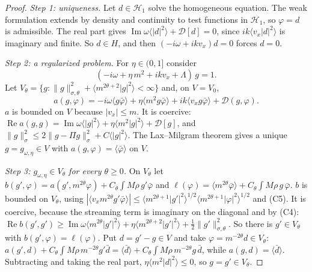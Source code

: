 \documentclass[11pt]{article}
\newcommand{\cD}{\mathcal{D}}
\newcommand{\cH}{\mathcal{H}}
\newcommand{\avg}[1]{\langle #1\rangle}
\renewcommand{\Re}{\operatorname{Re}}
\renewcommand{\Im}{\operatorname{Im}}
\theoremstyle{remark}
\begin{document}
\begin{proof}
\emph{Step 1: uniqueness.} Let $d\in\cH_1$ solve the homogeneous equation.
The weak formulation extends by density and continuity to test functions in
$\cH_1$, so $\varphi=d$ is admissible. The real part gives
$\Im\omega\avg{|d|^2}+\cD[d]=0$, since $ik\avg{v_x|d|^2}$ is imaginary and
finite. So $d\in H$, and then $(-i\omega+ikv_x)d=0$ forces $d=0$.

\emph{Step 2: a regularized problem.} For $\eta\in(0,1]$ consider
\begin{equation}
  (-i\omega+\eta\,m^2+ikv_x+\Lambda)\,g=1 .
  \label{eq:reg}
\end{equation}
Let $V_\theta=\{g:\|g\|^2_{\sigma,\theta}+\avg{m^{2\theta+2}|g|^2}<\infty\}$
and, on $V=V_0$,
\[
  a(g,\varphi)=-i\omega\avg{g\bar\varphi}+\eta\avg{m^2g\bar\varphi}
  +ik\avg{v_xg\bar\varphi}+\cD(g,\varphi).
\]
$a$ is bounded on $V$ because $|v_x|\le m$. It is coercive:
$\Re a(g,g)=\Im\omega\avg{|g|^2}+\eta\avg{m^2|g|^2}+\cD[g]$, and
$\|g\|^2_\sigma\le2\|g-\Pi g\|^2_\sigma+C\avg{|g|^2}$. The Lax--Milgram theorem
gives a unique $g=g_{\omega,\eta}\in V$ with $a(g,\varphi)=\avg{\bar\varphi}$
on $V$.

\emph{Step 3: $g_{\omega,\eta}\in V_\theta$ for every $\theta\ge0$.} On
$V_\theta$ let
$b(g',\varphi)=a(g',m^{2\theta}\varphi)+C_\theta\int M\rho\,g'\bar\varphi$ and
$\ell(\varphi)=\avg{m^{2\theta}\bar\varphi}+C_\theta\int M\rho\,g\,\bar\varphi$.
$b$ is bounded on $V_\theta$, using
$|\avg{v_xm^{2\theta}g'\bar\varphi}|\le\avg{m^{2\theta+1}|g'|^2}^{1/2}
\avg{m^{2\theta+1}|\varphi|^2}^{1/2}$ and (C5). It is coercive, because the
streaming term is imaginary on the diagonal and by (C4):
$\Re b(g',g')\ge\Im\omega\avg{m^{2\theta}|g'|^2}+\eta\avg{m^{2\theta+2}|g'|^2}
+\tfrac12\|g'\|^2_{\sigma,\theta}$. So there is $g'\in V_\theta$ with
$b(g',\varphi)=\ell(\varphi)$. Put $d=g'-g\in V$ and take
$\varphi=m^{-2\theta}d\in V_\theta$:
$a(g',d)+C_\theta\int M\rho\,m^{-2\theta}g'\bar d
=\avg{\bar d}+C_\theta\int M\rho\,m^{-2\theta}g\,\bar d$, while
$a(g,d)=\avg{\bar d}$. Subtracting and taking the real part,
$\eta\avg{m^2|d|^2}\le0$, so $g=g'\in V_\theta$.


\end{proof}
\end{document}
